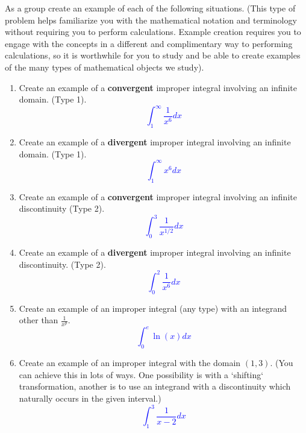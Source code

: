 \documentclass{ximera}
\begin{document}
\begin{exercise}
    As a group create an example of each of the following situations. (This type of problem helps familiarize you with the mathematical notation and terminology without requiring you to perform calculations. Example creation requires you to engage with the concepts in a different and complimentary way to performing calculations, so it is worthwhile for you to study and be able to create examples of the many types of mathematical objects we study).\\


\begin{enumerate}
\item Create an example of a {\bf{convergent}} improper integral involving an infinite domain. (Type 1).\\
\textcolor{blue}{ $$\int_1^\infty \frac{1}{x^6}dx$$}
\item Create an example of a {\bf{divergent}} improper integral involving an infinite domain. (Type 1).\\
\textcolor{blue}{ $$\int_1^\infty x^6dx$$}
\item Create an example of a {\bf{convergent}} improper integral involving an infinite discontinuity (Type 2).\\
\textcolor{blue}{ $$\int_0^3 \frac{1}{x^{1/2}}dx$$}
\item Create an example of a {\bf{divergent}} improper integral involving an infinite discontinuity. (Type 2).\\
\textcolor{blue}{ $$\int_0^2 \frac{1}{x^6}dx$$}
\item Create an example of an improper integral (any type) with an integrand other than $\frac{1}{x^p}$.\\
\textcolor{blue}{ $$\int_0^e \ln(x)dx$$}
\item Create an example of an improper integral with the domain $(1,3)$. (You can achieve this in lots of ways. One possibility is with a `shifting` transformation, another is to use an integrand with a discontinuity which naturally occurs in the given interval.)\\
\textcolor{blue}{$$\int_1^3\frac{1}{x-2}dx$$}
\end{enumerate}
\end{exercise}
\end{document}
